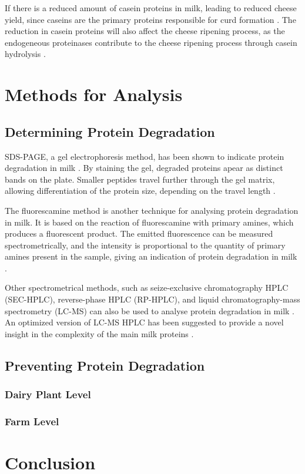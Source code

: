 If there is a reduced amount of casein proteins in milk, leading to reduced cheese yield, since caseins are the primary proteins responsible for curd formation \cite*{a02_proteases_and_protein_degradation}. The reduction in casein proteins will also affect the cheese ripening process, as the endogeneous proteinases contribute to the cheese ripening process through casein hydrolysis \cite*{a02_proteases_and_protein_degradation}.


\section{Methods for Analysis}

\subsection{Determining Protein Degradation}
SDS-PAGE, a gel electrophoresis method, has been shown to indicate protein degradation in milk \cite*{a02_proteases_and_protein_degradation}. By staining the gel, degraded proteins apear as distinct bands on the plate. Smaller peptides travel further through the gel matrix, allowing differentiation of the protein size, depending on the travel length  \cite*{a02_proteases_and_protein_degradation}.

The fluorescamine method is another technique for analysing protein degradation in milk. It is based on the reaction of fluorescamine with primary amines, which produces a fluorescent product. The emitted fluorescence can be measured spectrometrically, and the intensity is proportional to the quantity of primary amines present in the sample, giving an indication of protein degradation in milk \cite*{a02_proteases_and_protein_degradation}.

Other spectrometrical methods, such as seize-exclusive chromatography HPLC (SEC-HPLC), reverse-phase HPLC (RP-HPLC), and liquid chromatography-mass spectrometry (LC-MS) can also be used to analyse protein degradation in milk \cite*{s07_hplc_milk_components,a09_proteomics}. An optimized version of LC-MS HPLC has been suggested to provide a novel insight in the complexity of the main milk proteins \cite*{a09_proteomics}.

\subsection{Preventing Protein Degradation}

\subsubsection{Dairy Plant Level}

\subsubsection{Farm Level}



\section{Conclusion}

